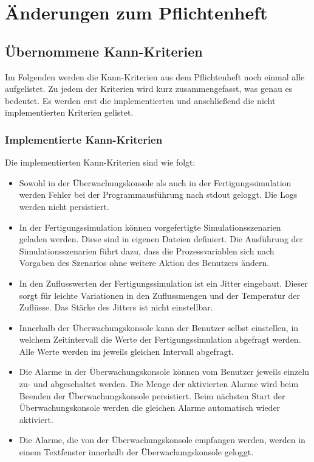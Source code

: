 \documentclass[parskip=full]{scrartcl}
\begin{document}
\pagebreak
\section{Änderungen zum Pflichtenheft}

\subsection{\"Ubernommene Kann-Kriterien}
Im Folgenden werden die Kann-Kriterien aus dem Pflichtenheft noch einmal alle aufgelistet. Zu jedem der Kriterien wird
kurz zusammengefasst, was genau es bedeutet. Es werden erst die implementierten und anschlie{\ss}end die nicht implementierten
Kriterien gelistet.

\subsubsection{Implementierte Kann-Kriterien}
Die implementierten Kann-Kriterien sind wie folgt:

\begin{itemize}
    \item Sowohl in der \"Uberwachungskonsole als auch in der Fertigungssimulation werden Fehler bei der Programmausf\"uhrung
    nach stdout geloggt. Die Logs werden nicht persistiert.
    \item In der Fertigungssimulation k\"onnen vorgefertigte Simulationsszenarien geladen werden. Diese sind in eigenen Dateien definiert.
    Die Ausführung der Simulationsszenarien f\"uhrt dazu, dass die Prozessvariablen sich nach Vorgaben des Szenarios ohne
    weitere Aktion des Benutzers \"andern.
    \item In den Zuflusswerten der Fertigungssimulation ist ein Jitter eingebaut. Dieser sorgt f\"ur leichte Variationen in den
    Zuflussmengen und der Temperatur der Zufl\"usse. Das Stärke des Jitters ist nicht einstellbar.
    \item Innerhalb der \"Uberwachungskonsole kann der Benutzer selbst einstellen, in welchem Zeitintervall die Werte der
    Fertigungssimulation abgefragt werden. Alle Werte werden im jeweils gleichen Intervall abgefragt.
    \item Die Alarme in der \"Uberwachungskonsole k\"onnen vom Benutzer jeweils einzeln zu- und abgeschaltet werden. Die Menge der
    aktivierten Alarme wird beim Beenden der \"Uberwachungskonsole persistiert. Beim n\"achsten Start der \"Uberwachungskonsole
    werden die gleichen Alarme automatisch wieder aktiviert.
    \item Die Alarme, die von der \"Uberwachungskonsole empfangen werden, werden in einem Textfenster innerhalb der
    \"Uberwachungskonsole geloggt.
\end{itemize}
\end{document}
